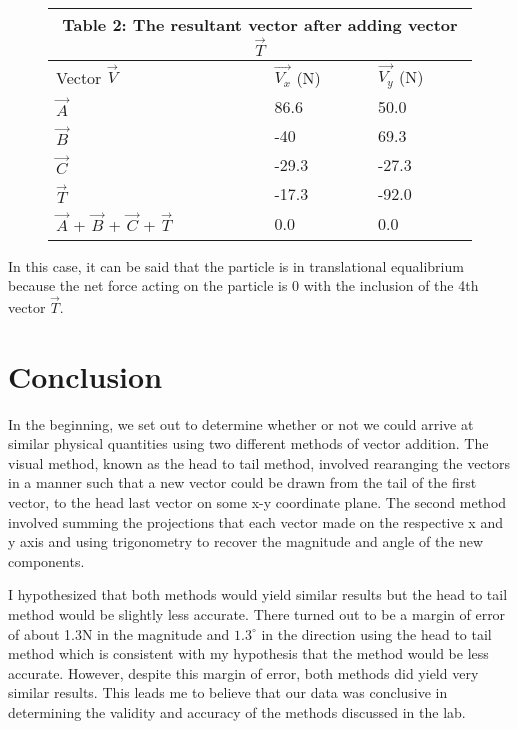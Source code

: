 \documentclass[12pt]{article}
\begin{document}
\begin{figure}[H]
    \centering
    \begin{tabular}{ |p{3cm}|p{3cm}|p{3cm}| }
        \hline
        \multicolumn{3}{|c|}{Table 2: The resultant vector after adding vector $\vec{T}$}              \\
        \hline
        Vector $\vec{V}$                              & $\vec{V_x}$ (N) & $\vec{V_y}$ (N) \\
        \hline
        $\vec{A}$                                     & 86.6            & 50.0            \\
        $\vec{B}$                                     & -40             & 69.3            \\
        $\vec{C}$                                     & -29.3           & -27.3           \\
        $\vec{T}$                                     & -17.3           & -92.0           \\
        \hline
        $\vec{A}$ + $\vec{B}$ + $\vec{C}$ + $\vec{T}$ & 0.0             & 0.0             \\
        \hline
    \end{tabular}
\end{figure}

In this case, it can be said that the particle is in translational equalibrium because the net force acting on the particle is 0 with the inclusion of the 4th vector $\vec{T}$.
\section{Conclusion}
In the beginning, we set out to determine whether or not we could arrive at similar physical quantities using two different methods of vector addition. The visual method, known as the head to tail method, involved rearanging the vectors in a manner such that a new vector could be drawn from the tail of the first vector, to the head last vector on some x-y coordinate plane. The second method involved summing the projections that each vector made on the respective x and y axis and using trigonometry to recover the magnitude and angle of the new components.

I hypothesized that both methods would yield similar results but the head to tail method would be slightly less accurate. There turned out to be a margin of error of about 1.3N in the magnitude and $1.3^\circ$ in the direction using the head to tail method which is consistent with my hypothesis that the method would be less accurate. However, despite this margin of error, both methods did yield very similar results. This leads me to believe that our data was conclusive in determining the validity and accuracy of the methods discussed in the lab.
\end{document}
